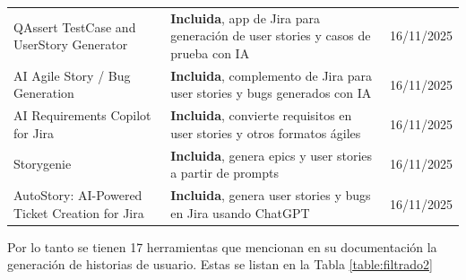 \begin{center}
\begin{longtable}{|p{6.5cm}|p{4cm}|p{1.8cm}|}
QAssert TestCase and UserStory Generator & \textbf{Incluida}, app de Jira para generación de user stories y casos de prueba con IA & 16/11/2025 \\
AI Agile Story / Bug Generation & \textbf{Incluida}, complemento de Jira para user stories y bugs generados con IA & 16/11/2025 \\
AI Requirements Copilot for Jira & \textbf{Incluida}, convierte requisitos en user stories y otros formatos ágiles & 16/11/2025 \\
Storygenie & \textbf{Incluida}, genera epics y user stories a partir de prompts & 16/11/2025 \\
AutoStory: AI-Powered Ticket Creation for Jira & \textbf{Incluida}, genera user stories y bugs en Jira usando ChatGPT & 16/11/2025 \\
\hline
\end{longtable}
\label{table:filtrado1}
\end{center}


Por lo tanto se tienen 17 herramientas que mencionan en su documentación la generación de historias de usuario. Estas se listan en la Tabla \ref{table:filtrado2}

